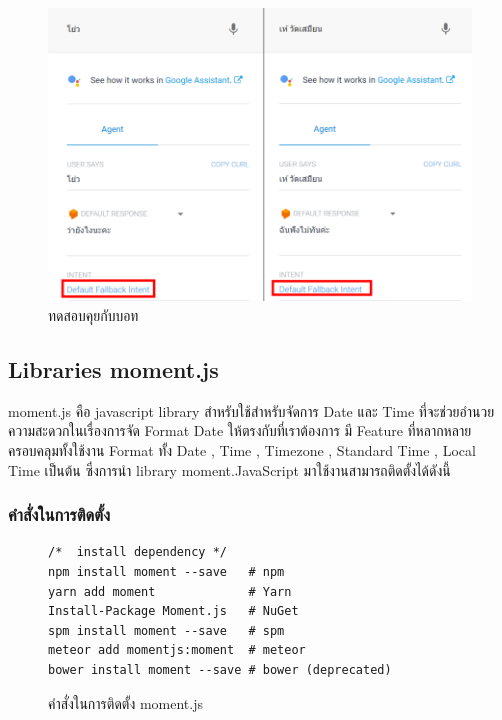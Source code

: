 \begin{enumerate}[label=\arabic*)]
	\begin{figure}[H]
		\centering
		\includegraphics[width=0.9\columnwidth]{Figures/2/dialogflow_6}
		\caption{ทดสอบคุยกับบอท}
		\label{Fig:dialogflow6}
	\end{figure}

\end{enumerate}



\subsection{Libraries moment.js}
moment.js คือ javascript library สำหรับใช้สำหรับจัดการ Date และ Time ที่จะช่วยอำนวยความสะดวกในเรื่องการจัด Format Date ให้ตรงกับที่เราต้องการ
มี Feature ที่หลากหลายครอบคลุมทั้งใช้งาน Format ทั้ง Date , Time , Timezone , Standard Time , Local Time เป็นต้น ซึ่งการนำ library moment.JavaScript 
มาใช้งานสามารถติดตั้งได้ดังนี้

\subsubsection{คำสั่งในการติดตั้ง}
	\begin{figure}[H]
		{\begin{lstlisting}
/*  install dependency */
npm install moment --save   # npm
yarn add moment             # Yarn
Install-Package Moment.js   # NuGet
spm install moment --save   # spm
meteor add momentjs:moment  # meteor
bower install moment --save # bower (deprecated)
		\end{lstlisting}}
	\centering
		\caption{คำสั่งในการติดตั้ง moment.js}
		\label{Fig:momentjs}
	\end{figure}

